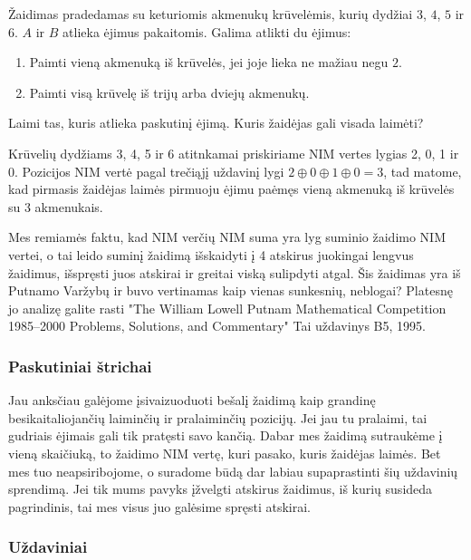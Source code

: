 \begin{pavnr}
  Žaidimas pradedamas su keturiomis akmenukų krūvelėmis, kurių dydžiai $3$,
  $4$, $5$ ir $6$. $A$ ir $B$ atlieka ėjimus pakaitomis. Galima atlikti du
  ėjimus:
  \begin{enumerate}
    \item Paimti vieną akmenuką iš krūvelės, jei joje lieka ne mažiau negu $2$.
    \item Paimti visą krūvelę iš trijų arba dviejų akmenukų.
  \end{enumerate}
  Laimi tas, kuris atlieka paskutinį ėjimą. Kuris žaidėjas gali visada laimėti?
\end{pavnr}

Krūvelių dydžiams 3, 4, 5 ir 6 atitnkamai priskiriame NIM vertes lygias 2, 0, 1
ir 0. Pozicijos NIM vertė pagal trečiąjį uždavinį lygi $2\oplus 0\oplus
1\oplus 0=3$, tad matome, kad pirmasis žaidėjas laimės pirmuoju ėjimu paėmęs
vieną akmenuką iš krūvelės su 3 akmenukais. 

\begin{pastaba}
  Mes remiamės faktu, kad NIM verčių NIM suma yra lyg suminio žaidimo NIM
  vertei, o tai leido suminį žaidimą išskaidyti į 4 atskirus juokingai lengvus
  žaidimus, išspręsti juos atskirai ir greitai viską sulipdyti atgal. Šis
  žaidimas yra iš Putnamo Varžybų ir buvo vertinamas kaip vienas sunkesnių,
  neblogai? Platesnę jo analizę galite rasti "The William Lowell Putnam
  Mathematical Competition 1985–2000 Problems, Solutions, and Commentary" Tai
  uždavinys B5, 1995.  
\end{pastaba}

\subsubsection{Paskutiniai štrichai}

Jau anksčiau galėjome įsivaizuoduoti bešalį žaidimą kaip grandinę
besikaitaliojančių laiminčių ir pralaiminčių pozicijų. Jei jau tu pralaimi, tai
gudriais ėjimais gali tik pratęsti savo kančią. Dabar mes žaidimą sutraukėme į
vieną skaičiuką, to žaidimo NIM vertę, kuri pasako, kuris žaidėjas laimės. Bet
mes tuo neapsiribojome, o suradome būdą dar labiau supaprastinti šių uždavinių
sprendimą. Jei tik mums pavyks įžvelgti atskirus žaidimus, iš kurių susideda
pagrindinis, tai mes visus juo galėsime spręsti atskirai. 

\subsubsection{Uždaviniai}

